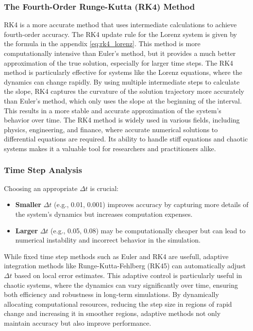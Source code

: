 \subsubsection{The Fourth-Order Runge-Kutta (RK4) Method}

RK4 is a more accurate method that uses intermediate calculations to achieve fourth-order accuracy. The RK4 update rule for the Lorenz system is given by the formula in the appendix \ref{eq:rk4_lorenz}. This method is more computationally intensive than Euler's method, but it provides a much better approximation of the true solution, especially for larger time steps.
The RK4 method is particularly effective for systems like the Lorenz equations, where the dynamics can change rapidly. By using multiple intermediate steps to calculate the slope, RK4 captures the curvature of the solution trajectory more accurately than Euler's method, which only uses the slope at the beginning of the interval. This results in a more stable and accurate approximation of the system's behavior over time.
The RK4 method is widely used in various fields, including physics, engineering, and finance, where accurate numerical solutions to differential equations are required. Its ability to handle stiff equations and chaotic systems makes it a valuable tool for researchers and practitioners alike.

\subsubsection{Time Step Analysis}

Choosing an appropriate $\Delta t$ is crucial:

\begin{itemize}
    \item \textbf{Smaller} $\Delta t$ (e.g., 0.01, 0.001) improves accuracy by capturing more details of the system’s dynamics but increases computation expenses.
    \item \textbf{Larger} $\Delta t$ (e.g., 0.05, 0.08) may be computationally cheaper but can lead to numerical instability and incorrect behavior in the simulation.
\end{itemize}
While fixed time step methods such as Euler and RK4 are usefull, adaptive integration methods like Runge-Kutta-Fehlberg (RK45) can automatically adjust $\Delta t$ based on local error estimates. This adaptive control is particularly useful in chaotic systems, where the dynamics can vary significantly over time, ensuring both efficiency and robustness in long-term simulations. By dynamically allocating computational resources, reducing the step size in regions of rapid change and increasing it in smoother regions, adaptive methods not only maintain accuracy but also improve performance.


